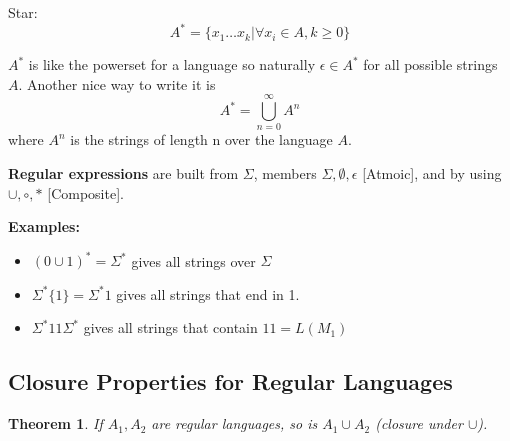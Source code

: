 \documentclass[12pt]{article}
\newtheorem{theorem}{Theorem}
\begin{document}
\noindent 
Star: 
\[ 
    A^* = \{x_1\dots x_k | \forall x_i \in A, k \geq 0\}  
\]

\noindent 
\(A^*\) is like the powerset for a language so naturally \(\epsilon \in A^*\) for 
all possible strings \(A\).
Another nice way to write it is 
\[
    A^* = \bigcup_{n=0}^{\infty} A^n
\]
where \(A^n\) is the strings of length n over the language \(A\).

\noindent 
\textbf{Regular expressions} are built from \(\Sigma\), 
members \(\Sigma, \emptyset, \epsilon\) [Atmoic], and by using 
\(\cup, \circ, *\) [Composite].

\noindent 
\textbf{Examples: }
\begin{itemize}
    \item \((0\cup 1)^* = \Sigma^* \) gives all strings over \(\Sigma\)
    \item \(\Sigma^* \{1\} = \Sigma^* 1\) gives all strings that end in 1.
    \item \(\Sigma^* 11 \Sigma^*\) gives all strings that contain \(11 = L(M_1)\)
\end{itemize}

\subsection*{Closure Properties for Regular Languages}
\begin{theorem}
    If \(A_1, A_2\) are regular languages, so is \(A_1 \cup A_2\) (closure under \(\cup\)).
\end{theorem}
\end{document}
